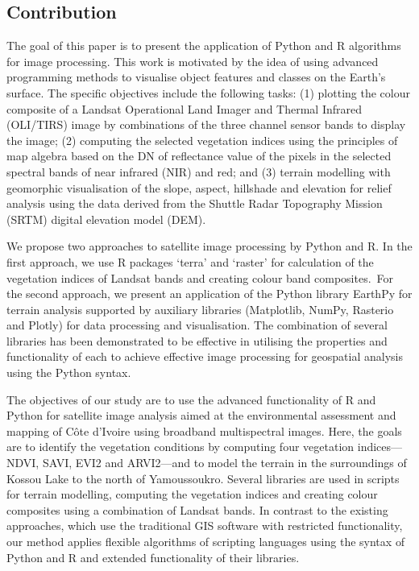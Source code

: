 \documentclass[jimaging,article,accept,pdftex,moreauthors]{Definitions/mdpi}
\begin{document}
\subsection{Contribution}

{The }goal of this paper is to present the application of Python and R algorithms for image processing{. This work is motivated by }the idea of using{ }advanced programming methods{ }to visualise{ }object features and classes on the Earth's surface{. The }specific objectives include the following tasks: (1) %
plotting the colour composite of a Landsat Operational Land Imager and Thermal Infrared (OLI/TIRS) image by{ } combinations of {the} three channel sensor bands to display the image; (2) computing the selected vegetation indices using the principles of map algebra based on {the} DN of reflectance value of the pixels in the selected spectral bands of near infrared (NIR) and red; and (3) terrain modelling with geomorphic visualisation of the slope, aspect, hillshade and elevation for relief analysis using the {data derived from the }Shuttle Radar Topography Mission (SRTM) digital elevation model (DEM). 

{We propose} two approaches{ }to{ }satellite image processing by{ }Python and R{. }In the first approach, we {use }R packages `terra' and `raster' for calculation of the vegetation indices {of Landsat bands} and creating colour band composites.~For the second approach, we {present} an application of the Python library EarthPy for terrain analysis supported by auxiliary libraries (Matplotlib, NumPy, Rasterio and Plotly) for data processing and visualisation. The combination of several libraries {has been demonstrated to be effective in utilising} the properties and functionality of each to achieve effective image processing for {geospatial} analysis {using the Python syntax}.

The objectives of our study {are} to use the advanced functionality of{ }R and Python for {satellite} image {analysis }aimed at {the} environmental assessment and mapping of C\^ote d'Ivoire{ using broadband multispectral images. Here, the goals are to identify the vegetation conditions by computing four vegetation indices---NDVI, SAVI, EVI2 and ARVI2---and to model} the terrain in the surroundings of Kossou Lake to the north of Yamoussoukro. {Several libraries are used in scripts for }terrain modelling, computing the vegetation indices {and creating colour composites using a} combination of Landsat bands. {In contrast to the existing approaches, which use the traditional GIS software with restricted functionality,} our method {applies} flexible algorithms of scripting languages {using the} syntax {of Python and R and extended functionality of their libraries}. 
\end{document}

